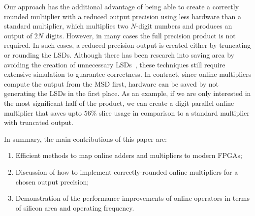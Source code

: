 \documentclass[conference]{IEEEtran}
\begin{document}
Our approach has the additional advantage of being able to create a correctly rounded multiplier with a reduced output precision using less hardware than a standard multiplier, which multiplies two $N$-digit numbers and produces an output of $2N$ digits. However, in many cases the full precision product is not required. In such cases, a reduced precision output is created either by truncating or rounding the LSDs. Although there has been research into saving area by avoiding the creation of unnecessary LSDs~\cite{TheoTC}, these techniques still require extensive simulation to guarantee correctness. In contract, since online multipliers compute the output from the MSD first, hardware can be saved by not generating the LSDs in the first place. As an example, if we are only interested in the most significant half of the product, we can create a digit parallel online multiplier that saves upto $56\%$ slice usage in comparison to a standard multiplier with truncated output.



In summary, the main contributions of this paper are:
\begin{enumerate}
    \item Efficient methods to map online adders and multipliers to modern FPGAs;
    \item Discussion of how to implement correctly-rounded online multipliers for a chosen output precision;
    \item Demonstration of the performance improvements of online operators in terms of silicon area and operating frequency.
\end{enumerate}

\end{document}
